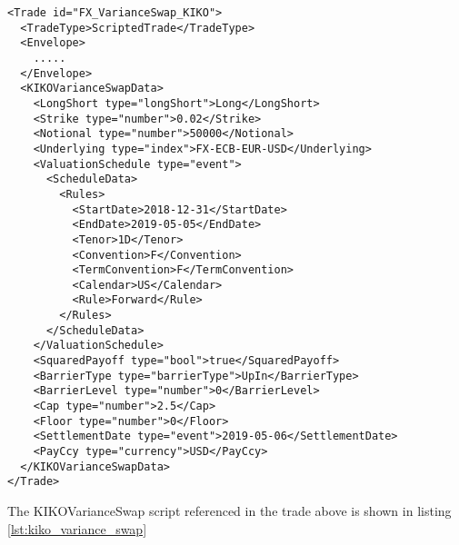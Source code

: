 \begin{verbatim}
<Trade id="FX_VarianceSwap_KIKO">
  <TradeType>ScriptedTrade</TradeType>
  <Envelope>
    .....
  </Envelope>
  <KIKOVarianceSwapData>    
    <LongShort type="longShort">Long</LongShort>
    <Strike type="number">0.02</Strike>
    <Notional type="number">50000</Notional>
    <Underlying type="index">FX-ECB-EUR-USD</Underlying>
    <ValuationSchedule type="event">
      <ScheduleData>
        <Rules>
          <StartDate>2018-12-31</StartDate>
          <EndDate>2019-05-05</EndDate>
          <Tenor>1D</Tenor>
          <Convention>F</Convention>
          <TermConvention>F</TermConvention>
          <Calendar>US</Calendar>
          <Rule>Forward</Rule>
        </Rules>
      </ScheduleData>
    </ValuationSchedule>
    <SquaredPayoff type="bool">true</SquaredPayoff>
    <BarrierType type="barrierType">UpIn</BarrierType>
    <BarrierLevel type="number">0</BarrierLevel>
    <Cap type="number">2.5</Cap>
    <Floor type="number">0</Floor>
    <SettlementDate type="event">2019-05-06</SettlementDate>
    <PayCcy type="currency">USD</PayCcy>
  </KIKOVarianceSwapData>
</Trade>
\end{verbatim}

The KIKOVarianceSwap script referenced in the trade above is shown in listing
\ref{lst:kiko_variance_swap}


